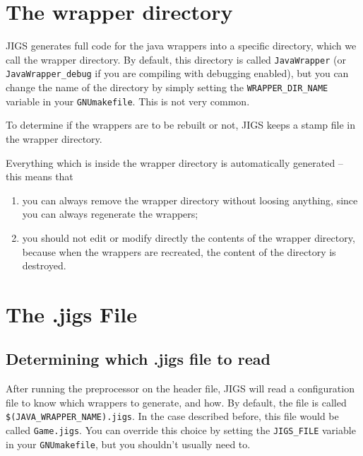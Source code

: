 \section{The wrapper directory}
JIGS generates full code for the java wrappers into a specific
directory, which we call the wrapper directory.  By default, this
directory is called \texttt{JavaWrapper} (or
\texttt{JavaWrapper\_debug} if you are compiling with debugging
enabled), but you can change the name of the directory by simply
setting the \texttt{WRAPPER\_DIR\_NAME} variable in your
\texttt{GNUmakefile}.  This is not very common.

To determine if the wrappers are to be rebuilt or not, JIGS keeps a
stamp file in the wrapper directory.

Everything which is inside the wrapper directory is automatically
generated -- this means that
\begin{enumerate}
\item you can always remove the wrapper directory without loosing anything, 
since you can always regenerate the wrappers;
\item you should not edit or modify directly the contents of the wrapper 
directory, because when the wrappers are recreated, the content of the 
directory is destroyed.
\end{enumerate}

\section{The .jigs File}

\subsection{Determining which .jigs file to read}
After running the preprocessor on the header file, JIGS will read a
configuration file to know which wrappers to generate, and how.  By
default, the file is called \texttt{\$(JAVA\_WRAPPER\_NAME).jigs}.  In
the case described before, this file would be called
\texttt{Game.jigs}.  You can override this choice by setting the
\texttt{JIGS\_FILE} variable in your \texttt{GNUmakefile}, but you
shouldn't usually need to.

